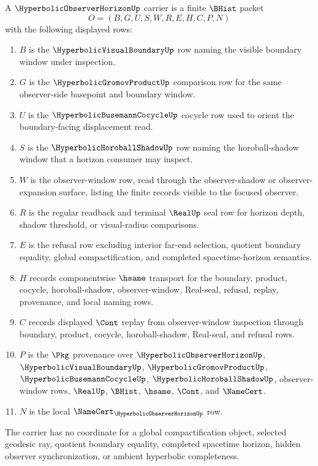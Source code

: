 \begin{definition}
\label{def:hyperbolic-observer-horizon-carrier}
A $\HyperbolicObserverHorizonUp$ carrier is a finite $\BHist$ packet
$$
O=(B,G,U,S,W,R,E,H,C,P,N)
$$
with the following displayed rows:
\begin{enumerate}
\item $B$ is the $\HyperbolicVisualBoundaryUp$ row naming the visible boundary window under inspection.
\item $G$ is the $\HyperbolicGromovProductUp$ comparison row for the same observer-side basepoint and boundary window.
\item $U$ is the $\HyperbolicBusemannCocycleUp$ cocycle row used to orient the boundary-facing displacement read.
\item $S$ is the $\HyperbolicHoroballShadowUp$ row naming the horoball-shadow window that a horizon consumer may inspect.
\item $W$ is the observer-window row, read through the observer-shadow or observer-expansion surface, listing the finite records visible to the focused observer.
\item $R$ is the regular readback and terminal $\RealUp$ seal row for horizon depth, shadow threshold, or visual-radius comparisons.
\item $E$ is the refusal row excluding interior far-end selection, quotient boundary equality, global compactification, and completed spacetime-horizon semantics.
\item $H$ records componentwise $\hsame$ transport for the boundary, product, cocycle, horoball-shadow, observer-window, Real-seal, refusal, replay, provenance, and local naming rows.
\item $C$ records displayed $\Cont$ replay from observer-window inspection through boundary, product, cocycle, horoball-shadow, Real-seal, and refusal rows.
\item $P$ is the $\Pkg$ provenance over $\HyperbolicObserverHorizonUp$, $\HyperbolicVisualBoundaryUp$, $\HyperbolicGromovProductUp$, $\HyperbolicBusemannCocycleUp$, $\HyperbolicHoroballShadowUp$, observer-window rows, $\RealUp$, $\BHist$, $\hsame$, $\Cont$, and $\NameCert$.
\item $N$ is the local $\NameCert_{\HyperbolicObserverHorizonUp}$ row.
\end{enumerate}
The carrier has no coordinate for a global compactification object, selected geodesic ray, quotient boundary equality, completed spacetime horizon, hidden observer synchronization, or ambient hyperbolic completeness.
\end{definition}

